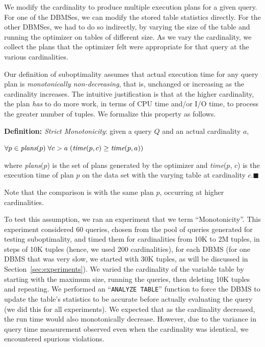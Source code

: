 \documentclass[prodmode,acmtods]{acmsmall}
\begin{document}
We modify the cardinality to produce multiple execution plans for a given
query. For one of the \hbox{DBMSes}, we can modify the stored table
statistics directly. For the other \hbox{DBMSes}, we had to do so
indirectly, by varying the size of the table and running the optimizer on
tables of different size. As we vary the cardinality, we collect the plans
that the optimizer felt were appropriate for that query at the various cardinalities.

Our definition of suboptimality assumes that
actual execution time for any query plan is {\em monotonically non-decreasing}, that is,
unchanged or increasing as the cardinality increases.  The intuitive justification is that at the higher
cardinality, the plan {\em has} to do more work, in terms of CPU time and/or
I/O time, to process the greater number of tuples.
We formalize this property as follows.

\vspace{1em}\noindent
{\bf Definition:} {\em Strict Monotonicity}: given a query $Q$ and an actual
cardinality $a$,

\quad\quad\quad\quad\quad$\forall p \in \hbox{\em plans} (p) \;\forall c > a \;( \hbox{\em time} (p,
c) \geq \hbox{\em time} (p,a) )$

\vspace{1em}\noindent
where {\em plans}($p$) is the set of plans generated by the optimizer and
{\em time}($p$, $c$) is the execution time of plan $p$ on the data set with
the varying table at cardinality $c$.\hfill$\blacksquare$

\vspace{1em}
\noindent
Note that the comparison is with the same plan $p$, occurring at higher
cardinalities.

To test this assumption, we ran an experiment that we term
``Monotonicity''. This experiment considered 60 queries, chosen from the
pool of queries
generated for testing suboptimality, and timed them for cardinalities from 10K
to 2M tuples, in steps of 10K tuples (hence, we used 200 cardinalities), for
each \hbox{DBMS} (for one \hbox{DBMS} that was very slow, we started with
30K tuples, as will be
discussed in Section~\ref{sec:experiments}). We varied the cardinality of the variable table by starting with
the maximum size, running the queries, then deleting 10K tuples and repeating.
We performed an ``{\tt ANALYZE TABLE}'' function to force
the \hbox{DBMS} to update the table's statistics to be accurate before actually
evaluating the query (we did this for all experiments).
We expected that as the cardinality decreased,
the run time would also monotonically decrease. However, due to the variance in query
time measurement observed even when the cardinality was identical, we encountered
spurious violations. 
\end{document}
